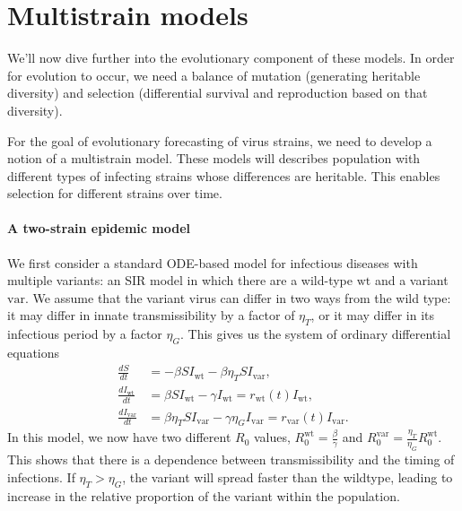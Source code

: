 \section{Multistrain models}

We'll now dive further into the evolutionary component of these models. 
In order for evolution to occur, we need a balance of mutation (generating heritable diversity) and selection (differential survival and reproduction based on that diversity).

For the goal of evolutionary forecasting of virus strains, we need to develop a notion of a multistrain model.
These models will describes population with different types of infecting strains whose differences are heritable.
This enables selection for different strains over time.

\paragraph{A two-strain epidemic model}%

We first consider a standard ODE-based model for infectious diseases with multiple variants: an SIR model in which there are a wild-type $\text{wt}$ and a variant $\text{var}$.
We assume that the variant virus can differ in two ways from the wild type: it may differ in innate transmissibility by a factor of $\eta_{T}$, or it may differ in its infectious period by a factor $\eta_{G}$.
This gives us the system of ordinary differential equations
\begin{align}
  \frac{d S}{d t} &= - \beta S I_{\text{wt}} - \beta \eta_{T} S I_{\text{var}},\\
  \frac{d I_{\text{wt}} }{d t} &= \beta S I_{\text{wt}} - \gamma I_{\text{wt}} = r_{\text{wt}}(t) I_{\text{wt}},\\
  \frac{d I_{\text{var}}}{d t} &= \beta \eta_{T} S I_{\text{var}} - \gamma \eta_{G} I_{\text{var}} = r_{\text{var}}(t) I_{\text{var}}.
\end{align}
In this model, we now have two different $R_{0}$ values, $R_{0}^{\text{wt}} = \frac{\beta}{\gamma}$ and $R_{0}^{\text{var}} = \frac{\eta_{T}}{\eta_{G}}R_{0}^{\text{wt}}$.
This shows that there is a dependence between transmissibility and the timing of infections.
If $\eta_{T} > \eta_{G}$, the variant will spread faster than the wildtype, leading to increase in the relative proportion of the variant within the population.

